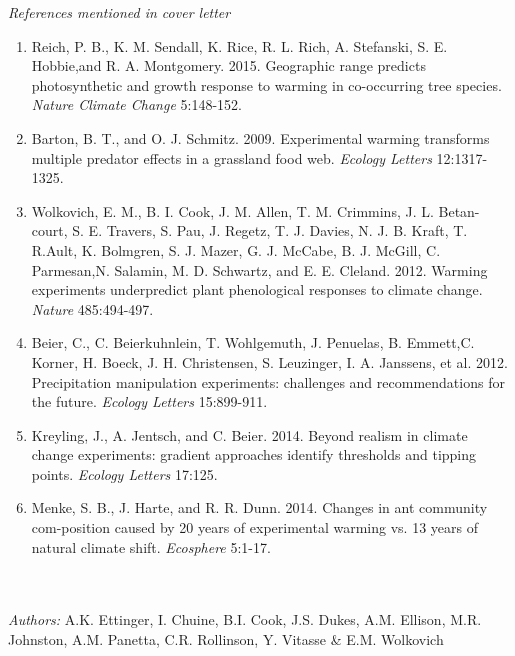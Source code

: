 \documentclass[11pt,a4paper]{letter}
\begin{document}
\begin{letter}{}
\noindent \emph{References mentioned in cover letter}
\begin{footnotesize}
\begin{enumerate}
\item Reich,  P. B.,  K. M. Sendall,  K. Rice,  R. L. Rich,  A. Stefanski,  S. E. Hobbie,and R. A. Montgomery. 2015.  Geographic range predicts photosynthetic and growth response to warming in co-occurring tree species.  \emph{Nature Climate Change} 5:148-152.
\item Barton,  B.  T.,  and  O.  J.  Schmitz.  2009.   Experimental  warming  transforms multiple predator effects in a grassland food web.   \emph{Ecology Letters} 12:1317-1325.
\item Wolkovich,  E.  M.,  B.  I.  Cook,  J.  M.  Allen,  T.  M.  Crimmins,  J.  L.  Betan-court, S. E. Travers, S. Pau, J. Regetz, T. J. Davies, N. J. B. Kraft, T. R.Ault, K. Bolmgren, S. J. Mazer, G. J. McCabe, B. J. McGill, C. Parmesan,N. Salamin, M. D. Schwartz, and E. E. Cleland. 2012.  Warming experiments underpredict plant phenological responses to climate change.  \emph{Nature} 485:494-497.
\item Beier,   C.,   C.   Beierkuhnlein,   T.   Wohlgemuth,   J.   Penuelas,   B.   Emmett,C. Korner, H. Boeck, J. H. Christensen, S. Leuzinger, I. A. Janssens, et al. 2012.  Precipitation manipulation experiments: challenges and recommendations for the future.  \emph{Ecology Letters} 15:899-911.
\item Kreyling, J., A. Jentsch, and C. Beier. 2014.  Beyond realism in climate change experiments: gradient  approaches  identify  thresholds  and  tipping  points. \emph{Ecology Letters} 17:125.
\item Menke, S. B., J. Harte, and R. R. Dunn. 2014. Changes in ant community com-position caused by 20 years of experimental warming vs. 13 years of natural climate shift.  \emph{Ecosphere} 5:1-17.

\end{enumerate}
\end{footnotesize}


\newpage
{}\\
\\
\noindent \emph{Authors:} A.K. Ettinger, I. Chuine, B.I. Cook, J.S. Dukes, A.M. Ellison, M.R. Johnston, A.M. Panetta, C.R. Rollinson, Y. Vitasse \& E.M. Wolkovich
\\


\end{letter}
\end{document}
